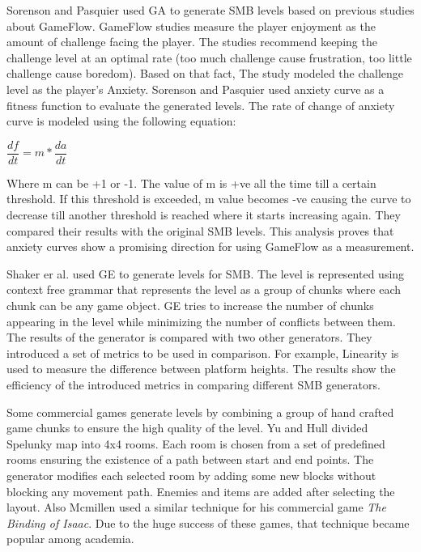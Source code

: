 Sorenson and Pasquier\cite{smbEvolutionFun} used GA to generate SMB levels based on previous studies about GameFlow\cite{gameFlow1, gameFlow2, gameFlow3}. GameFlow studies measure the player enjoyment as the amount of challenge facing the player. The studies recommend keeping the challenge level at an optimal rate (too much challenge cause frustration, too little challenge cause boredom). Based on that fact, The study modeled the challenge level as the player's Anxiety. Sorenson and Pasquier used anxiety curve as a fitness function to evaluate the generated levels. The rate of change of anxiety curve is modeled using the following equation:
\begin{center}
$\dfrac{df}{dt} = m * \dfrac{da}{dt}$
\end{center}
Where m can be +1 or -1. The value of m is +ve all the time till a certain threshold. If this threshold is exceeded, m value becomes -ve causing the curve to decrease till another threshold is reached where it starts increasing again. They compared their results with the original SMB levels. This analysis proves that anxiety curves show a promising direction for using GameFlow as a measurement.\\\par

Shaker er al.\cite{grammarSMB} used GE to generate levels for SMB. The level is represented using context free grammar that represents the level as a group of chunks where each chunk can be any game object. GE tries to increase the number of chunks appearing in the level while minimizing the number of conflicts between them. The results of the generator is compared with two other generators. They introduced a set of metrics to be used in comparison. For example, Linearity is used to measure the difference between platform heights. The results show the efficiency of the introduced metrics in comparing different SMB generators.\\\par

Some commercial games generate levels by combining a group of hand crafted game chunks to ensure the high quality of the level. Yu and Hull\cite{spelunkyTechnique} divided Spelunky map into 4x4 rooms. Each room is chosen from a set of predefined rooms ensuring the existence of a path between start and end points. The generator modifies each selected room by adding some new blocks without blocking any movement path. Enemies and items are added after selecting the layout. Also Mcmillen\cite{theBindingOfIsaacTechnique} used a similar technique for his commercial game \emph{The Binding of Isaac}. Due to the huge success of these games, that technique became popular among academia.\\\par

